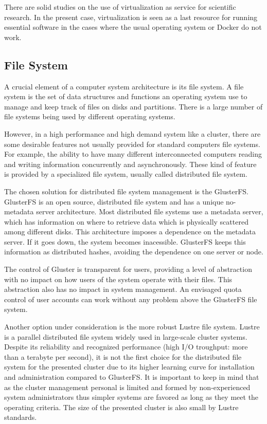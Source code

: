 \documentclass[twoside,a4paper,12pt,english]{inac17}
\begin{document}
There are solid studies on the use of virtualization as service for scientific research\cite{vir1,vir2}. In the present case, virtualization
is seen as a last resource for running essential software in the cases where the usual operating system or Docker do not work.

\subsection{File System}

A crucial element of a computer system architecture is its file system. A file system is the set of data structures and functions an operating system
use to manage and keep track of files on disks and partitions. There is a large number of file systems being used by different operating systems\cite{linuxbook}.

However, in a high performance and high demand system like a cluster, there are some desirable features not usually provided for standard computers file systems.
For example, the ability to have many different interconnected computers reading and writing information concurrently and asynchronously. These kind of feature
is provided by a specialized file system, usually called distributed file system\cite{hal}.

The chosen solution for distributed file system management is the GlusterFS\cite{gluster}. GlusterFS is an open source, distributed file system and has
a unique no-metadata server architecture. Most distributed file systems use a metadata server, which has information on where to retrieve data which is
physically scattered among different disks. This architecture imposes a dependence on the metadata server. If it goes down, the system becomes inacessible.
GlusterFS keeps this information as distributed hashes, avoiding the dependence on one server or node.

The control of Gluster is transparent for users, providing a level of abstraction with no impact on how users of the system operate with their files. This
abstraction also has no impact in system management. An envisaged quota control of user accounts can work without any problem above the GlusterFS file system.

Another option under consideration is the more robust Lustre file system\cite{lustre}. Lustre is a parallel distributed file system widely used in large-scale
cluster systems. Despite its reliability and recognized performance (high I/O troughput: more than a terabyte per second), it is not the first choice
for the distributed file system for the presented cluster due to its higher learning curve for installation and administration compared to GlusterFS.
It is important to keep in mind that as the cluster management personal is limited and formed by non-experienced system
administrators thus simpler systems are favored as long as they meet the operating criteria. The size of the presented cluster is also small by Lustre standards.
\end{document}
